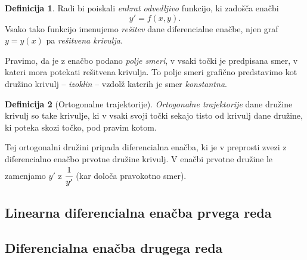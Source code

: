 \documentclass[11pt]{article}
\theoremstyle{definition}
\newtheorem{definicija}{Definicija}[section]
\theoremstyle{definition}
\theoremstyle{definition}
\theoremstyle{theorem}
\begin{document}
\begin{definicija}

Radi bi poiskali \textit{enkrat odvedljivo} funkcijo, ki zadošča enačbi
$$y' = f(x, y).$$
Vsako tako funkcijo imenujemo \textit{rešitev} dane diferencialne enačbe, njen graf $y = y(x)$ pa \textit{rešitvena krivulja}.

Pravimo, da je z enačbo podano \textit{polje smeri}, v vsaki točki je predpisana smer, v kateri mora potekati rešitvena krivulja. To polje smeri grafično predstavimo kot družino krivulj \--- \textit{izoklin} \--- vzdolž katerih je smer \textit{konstantna}.

\end{definicija}
\vspace{0.5cm}

\begin{definicija}[Ortogonalne trajektorije]

\textit{Ortogonalne trajektorije} dane družine krivulj so take krivulje, ki v vsaki svoji točki sekajo tisto od krivulj dane družine, ki poteka skozi točko, pod pravim kotom.

Tej ortogonalni družini pripada diferencialna enačba, ki je v preprosti zvezi z diferencialno enačbo prvotne družine krivulj. V enačbi prvotne družine le zamenjamo $y'$ z $\cfrac{1}{y'}$ (kar določa pravokotno smer).

\end{definicija}
\vspace{0.5cm}


\subsection{Linearna diferencialna enačba prvega reda}
\vspace{0.5cm}


\subsection{Diferencialna enačba drugega reda}
\vspace{0.5cm}


\pagebreak

\end{document}
